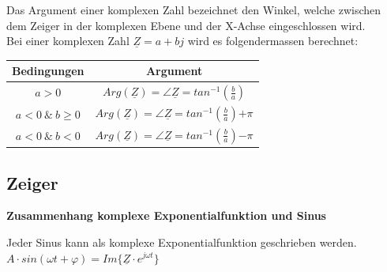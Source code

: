 \beginip
Das Argument einer komplexen Zahl bezeichnet den Winkel, welche zwischen dem Zeiger in der komplexen Ebene und der X-Achse eingeschlossen wird. \\
Bei einer komplexen Zahl $ \underline{Z} =  a + bj$ wird es folgendermassen berechnet: \\
\begin{center}

\begin{tabular}{cc}
 Bedingungen & Argument \\
\hline
\hline
$ a > 0 $ & $ Arg(\underline{Z}) = \angle \underline{Z} = tan^{-1}(\frac{b}{a})$ \\
\hline
$ a < 0 \ \& \ b \geq 0 $ & $ Arg(\underline{Z}) = \angle \underline{Z} = tan^{-1}(\frac{b}{a}) \mathbf{+} \pi$ \\
\hline
$ a < 0  \ \& \  b< 0 $ & $ Arg(\underline{Z}) = \angle \underline{Z} = tan^{-1}(\frac{b}{a}) \mathbf{-} \pi$ \\
\hline
\end{tabular}
\end{center}

\iend
\begin{center}

\end{center}


\newpage
\subsection{Zeiger}
\textbf{Zusammenhang komplexe Exponentialfunktion und Sinus}


Jeder Sinus kann als komplexe Exponentialfunktion geschrieben werden. \\
\formulaBegin
$ A \cdot sin(\omega t + \varphi) = Im\{\underline{Z} \cdot e^{j\omega t}\} $
\formulaEnd

\begin{center}
\end{center}

